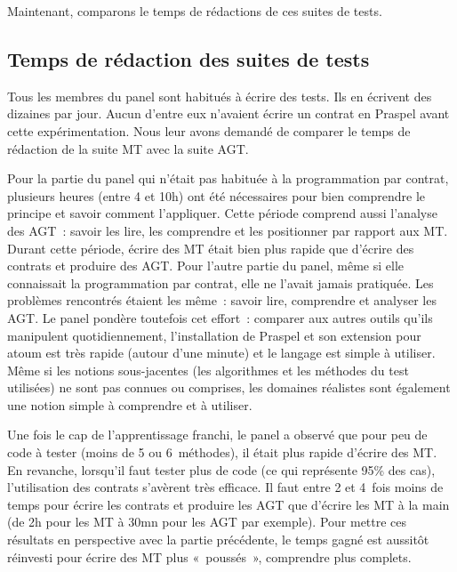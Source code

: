 Maintenant, comparons le temps de rédactions de ces suites de tests.

\subsection{Temps de rédaction des suites de tests}
\label{subsection:experimentation:time}

%

Tous les membres du panel sont habitués à écrire des tests. Ils en écrivent des
dizaines par jour. Aucun d'entre eux n'avaient écrire un contrat en Praspel
avant cette expérimentation. Nous leur avons demandé de comparer le temps de
rédaction de la suite MT avec la suite AGT.

Pour la partie du panel qui n'était pas habituée à la programmation par contrat,
plusieurs heures (entre 4 et 10h) ont été nécessaires pour bien comprendre le
principe et savoir comment l'appliquer. Cette période comprend aussi l'analyse
des AGT~: savoir les lire, les comprendre et les positionner par rapport aux MT.
Durant cette période, écrire des MT était bien plus rapide que d'écrire des
contrats et produire des AGT. Pour l'autre partie du panel, même si elle
connaissait la programmation par contrat, elle ne l'avait jamais pratiquée. Les
problèmes rencontrés étaient les même~: savoir lire, comprendre et analyser les
AGT. Le panel pondère toutefois cet effort~: comparer aux autres outils qu'ils
manipulent quotidiennement, l'installation de Praspel et son extension pour
atoum est très rapide (autour d'une minute) et le langage est simple à utiliser.
Même si les notions sous-jacentes (les algorithmes et les méthodes du test
utilisées) ne sont pas connues ou comprises, les domaines réalistes sont
également une notion simple à comprendre et à utiliser.

Une fois le cap de l'apprentissage franchi, le panel a observé que pour peu de
code à tester (moins de 5 ou 6~méthodes), il était plus rapide d'écrire des MT.
En revanche, lorsqu'il faut tester plus de code (ce qui représente 95\% des
cas), l'utilisation des contrats s'avèrent très efficace. Il faut entre 2 et
4~fois moins de temps pour écrire les contrats et produire les AGT que d'écrire
les MT à la main (de 2h pour les MT à 30mn pour les AGT par exemple). Pour
mettre ces résultats en perspective avec la partie précédente, le temps gagné
est aussitôt réinvesti pour écrire des MT plus «~poussés~», comprendre plus
complets.

